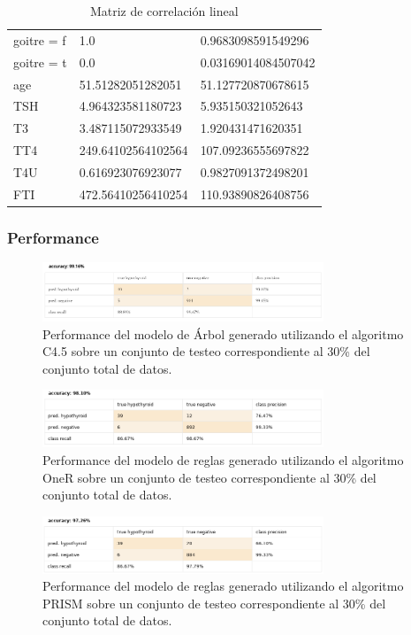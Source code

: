 \documentclass[osajnl,twocolumn,showpacs,superscriptaddress,10pt,floatfix]{revtex4-1} %
\begin{document}
\begin{table}[ht]
\begin{tabular}{lll}
        goitre = f & 1.0 & 0.9683098591549296 \\
        goitre = t & 0.0 & 0.03169014084507042 \\
        age & 51.51282051282051 & 51.127720870678615 \\
        TSH & 4.964323581180723 & 5.935150321052643 \\
        T3 & 3.487115072933549 & 1.920431471620351 \\
        TT4 & 249.64102564102564 & 107.09236555697822 \\
        T4U & 0.616923076923077 & 0.9827091372498201 \\
        FTI & 472.56410256410254 & 110.93890826408756 \\

        \hline
    \end{tabular}
    \caption{Matriz de correlación lineal}
    \label{table:k_means_model}
\end{table}

\subsubsection{Performance} \label{apendix:models:performance} 

\begin{figure}[h]
    \centering
    \includegraphics[width=0.75\textwidth]{models/w_j48_performance}
    \caption{Performance del modelo de Árbol generado utilizando el algoritmo C4.5 sobre un conjunto de testeo correspondiente al 30\% del conjunto total de datos.}
    \label{figure:w_j48_performance}
\end{figure}

\begin{figure}[h]
    \centering
    \includegraphics[width=0.75\textwidth]{models/w_oneR_performance}
    \caption{Performance del modelo de reglas generado utilizando el algoritmo OneR sobre un conjunto de testeo correspondiente al 30\% del conjunto total de datos.}
    \label{figure:w_oneR_performance}
\end{figure}

\begin{figure}[h]
    \centering
    \includegraphics[width=0.75\textwidth]{models/prism_performance}
    \caption{Performance del modelo de reglas generado utilizando el algoritmo PRISM sobre un conjunto de testeo correspondiente al 30\% del conjunto total de datos.}
    \label{figure:prism_performance}
\end{figure}
\end{document}
